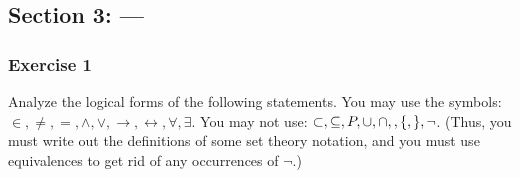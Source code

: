 
\subsection{Section 3: ---}

\subsubsection{Exercise 1}
\question Analyze the logical forms of the following statements. You may use the
symbols: $\in, \neq, =, \wedge, \vee, \rightarrow, \leftrightarrow, \forall, \exists$.  You may not use: $\subset, \subseteq, P, \cup, \cap, \/, \{, \}, \neg$.  (Thus, you must write out the definitions
of some set theory notation, and you must use equivalences to get rid of
any occurrences of $\neg$.)

